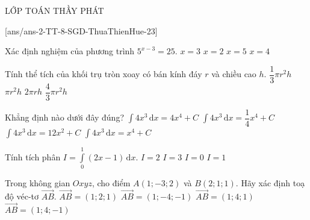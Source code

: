 \begin{name}
	{\tenchude}{\tendethi}{LỚP TOÁN THẦY PHÁT}{\thoigian}
\end{name}
\setcounter{ex}{0}\setcounter{bt}{0}
[ans/ans-2-TT-8-SGD-ThuaThienHue-23]
\begin{ex}%
	Xác định nghiệm của phương trình $5^{x-3}=25$.
	\choice
	{$x=3$}
	{$x=2$}
	{\True $x=5$}
	{$x=4$}
\end{ex}
\begin{ex}%
	Tính thể tích của khối trụ tròn xoay có bán kính đáy $r$ và chiều cao $h$.
	\choice
	{$\dfrac{1}{3}\pi r^2 h$}
	{\True $\pi r^2 h$}
	{$2\pi r h$}
	{$\dfrac{4}{3} \pi r^2 h$}
\end{ex}
\begin{ex}%
	Khẳng định nào dưới đây đúng?
	\choice
	{$\displaystyle\int 4x^3 \mathrm{\,d}x=4x^4+C$}
	{$\displaystyle\int 4x^3 \mathrm{\,d}x=\dfrac{1}{4}x^4+C$}
	{$\displaystyle\int 4x^3 \mathrm{\,d}x=12x^2+C$}
	{\True $\displaystyle\int 4x^3 \mathrm{\,d}x=x^4+C$}
\end{ex}
\begin{ex}%
	Tính tích phân $I=\displaystyle\int\limits_0^1(2x-1) \mathrm{\,d}x$.
	\choice
	{$I=2$}
	{$I=3$}
	{\True $I=0$}
	{$I=1$}
\end{ex}
\begin{ex}%
	Trong không gian $Oxyz$, cho điểm $A(1;-3;2)$ và $B(2;1;1)$. Hãy xác định toạ độ véc-tơ $\overrightarrow{AB}$.
	\choice
	{$\overrightarrow{AB}=(1;2;1)$}
	{$\overrightarrow{AB}=(1;-4;-1)$}
	{$\overrightarrow{AB}=(1;4;1)$}
	{\True $\overrightarrow{AB}=(1;4;-1)$}
\end{ex}
